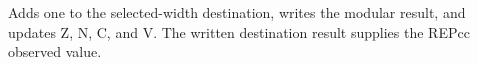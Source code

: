 Adds one to the selected-width destination, writes the modular result, and updates Z, N, C, and V. The written destination result supplies the REPcc observed value.
